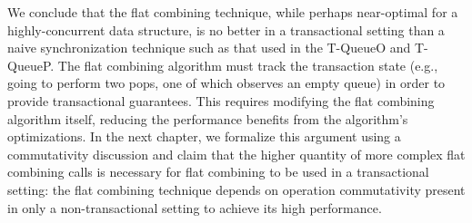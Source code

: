 We conclude that the flat combining technique, while perhaps near-optimal for a highly-concurrent data structure, is no better in a transactional setting than a naive synchronization technique such as that used in the T-QueueO and T-QueueP. The flat combining algorithm must track the transaction state (e.g., going to perform two pops, one of which observes an empty queue) in order to provide transactional guarantees. This requires modifying the flat combining algorithm itself, reducing the performance benefits from the algorithm's optimizations. In the next chapter, we formalize this argument using a commutativity discussion and claim that the higher quantity of more complex flat combining calls is necessary for flat combining to be used in a transactional setting: the flat combining technique depends on operation commutativity present in only a non-transactional setting to achieve its high performance. 

\iffalse
For ease of reference, we list here the names of queues discussed in this section. Their meaning is explained in context with more detail within the discussion.
\begin{itemize}
    \item T-QueueO: the optimistic, transactional, and naively-concurrent queue.
    \item T-QueueP: the transactional and naively-concurrent queue that performs pessimistic locking upon performing a pop.
    \item NT-FCQueue: the non-transactional flat combining queue.
    \item NT-FCQueueWrapped: a version of NT-FCQueue that invokes STO \texttt{start\_transaction} and \texttt{commit\_transaction} calls.
    \item T-FCQueue: the fully-transactional flat-combining queue.
\end{itemize}

\fi
